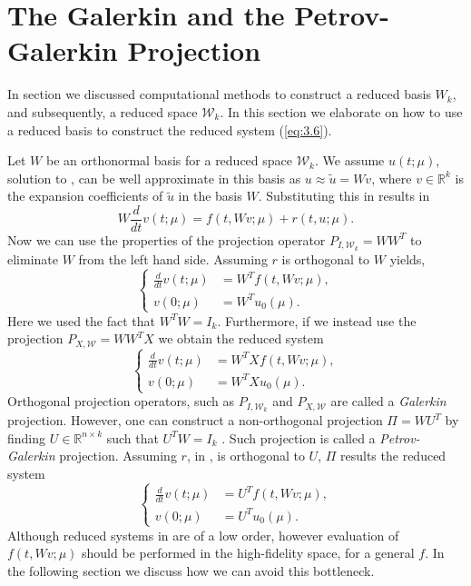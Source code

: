 \section{The Galerkin and the Petrov-Galerkin Projection} \label{sec:3.4}
In section  we discussed computational methods to construct a reduced basis $W_k$, and subsequently, a reduced space $\mathcal W_k$. In this section we elaborate on how to use a reduced basis to construct the reduced system (\ref{eq:3.6}).

Let $W$ be an orthonormal basis for a reduced space $\mathcal W_k$. We assume $u(t;\mu)$, solution to , can be well approximate in this basis as $u \approx \tilde u = W v$, where $v\in \mathbb R^{k}$ is the expansion coefficients of $\tilde u$ in the basis $W$. Substituting this in 
 results in
\begin{equation} \label{eq:3.25}
	W \frac{d}{dt} v(t;\mu) = f(t,Wv;\mu) + r(t,u;\mu).
\end{equation}
Now we can use the properties of the projection operator $P_{I,\mathcal W_k} = WW^T$ to eliminate $W$ from the left hand side. Assuming $r$ is orthogonal to $W$ yields,
\begin{equation} \label{eq:3.26}
	\left\{
	\begin{aligned}
	\frac{d}{dt} v(t;\mu) &= W^T f(t,Wv;\mu), \\
	v(0;\mu) &= W^T u_0(\mu).
	\end{aligned}
	\right.
\end{equation}
Here we used the fact that $W^TW = I_k$. Furthermore, if we instead use the projection $P_{X,\mathcal W} = WW^TX$ we obtain the reduced system
\begin{equation} \label{eq:3.27}
	\left\{
	\begin{aligned}
	\frac{d}{dt} v(t;\mu) &= W^T X f(t,Wv;\mu), \\
	v(0;\mu) &= W^T X u_0(\mu).
	\end{aligned}
	\right.
\end{equation}
Orthogonal projection operators, such as $P_{I,\mathcal W_k}$ and $P_{X,\mathcal W}$ are called a \emph{Galerkin} projection. However, one can construct a non-orthogonal projection $\Pi = WU^T$ by finding $U\in \mathbb R^{n\times k}$ such that $U^TW = I_k$ \cite{hesthaven2015certified,quarteroni2015reduced,doi:10.1137/1.9780898718713}. Such projection is called a \emph{Petrov-Galerkin} projection. Assuming $r$, in , is orthogonal to $U$, $\Pi$ results the reduced system
\begin{equation} \label{eq:3.28}
	\left\{
	\begin{aligned}
	\frac{d}{dt} v(t;\mu) &= U^T f(t,Wv;\mu), \\
	v(0;\mu) &= U^T u_0(\mu).
	\end{aligned}
	\right.
\end{equation} 
Although reduced systems in  are of a low order, however evaluation of $f(t,Wv;\mu)$ should be performed in the high-fidelity space, for a general $f$. In the following section we discuss how we can avoid this bottleneck. 

